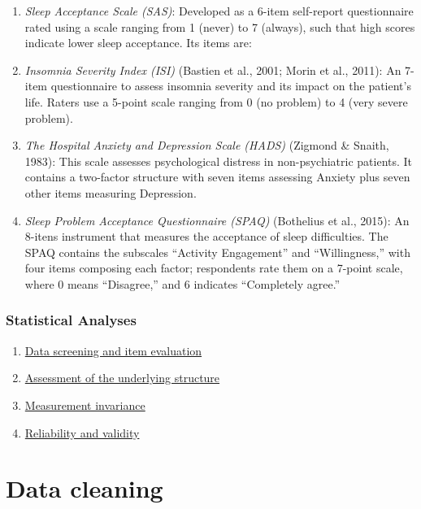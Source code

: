 \documentclass[
  letterpaper,
  DIV=11,
  numbers=noendperiod]{scrreprt}
\providecommand{\tightlist}{%
  \setlength{\itemsep}{0pt}\setlength{\parskip}{0pt}}\usepackage{longtable,booktabs,array}
\begin{document}
\begin{enumerate}
\def\labelenumi{\arabic{enumi}.}
\item
  \emph{Sleep Acceptance Scale (SAS)}: Developed as a 6-item self-report
  questionnaire rated using a scale ranging from 1 (never) to 7
  (always), such that high scores indicate lower sleep acceptance. Its
  items are:
\item
  \emph{Insomnia Severity Index (ISI)} (Bastien et al., 2001; Morin et
  al., 2011): An 7-item questionnaire to assess insomnia severity and
  its impact on the patient's life. Raters use a 5-point scale ranging
  from 0 (no problem) to 4 (very severe problem).
\item
  \emph{The Hospital Anxiety and Depression Scale (HADS)} (Zigmond \&
  Snaith, 1983): This scale assesses psychological distress in
  non-psychiatric patients. It contains a two-factor structure with
  seven items assessing Anxiety plus seven other items measuring
  Depression.
\item
  \emph{Sleep Problem Acceptance Questionnaire (SPAQ)} (Bothelius et
  al., 2015): An 8-itens instrument that measures the acceptance of
  sleep difficulties. The SPAQ contains the subscales ``Activity
  Engagement'' and ``Willingness,'' with four items composing each
  factor; respondents rate them on a 7-point scale, where 0 means
  ``Disagree,'' and 6 indicates ``Completely agree.''
\end{enumerate}

\hypertarget{statistical-analyses}{%
\subsection{Statistical Analyses}\label{statistical-analyses}}

\begin{enumerate}
\def\labelenumi{\arabic{enumi}.}
\tightlist
\item
  \protect\hyperlink{data-screening}{Data screening and item evaluation}
\item
  \protect\hyperlink{dimensionality-analyses}{Assessment of the
  underlying structure}
\item
  \protect\hyperlink{invariance}{Measurement invariance}
\item
  \protect\hyperlink{reliability-and-validity}{Reliability and validity}
\end{enumerate}


\hypertarget{data-cleaning}{%
\chapter{Data cleaning}\label{data-cleaning}}
\end{document}
